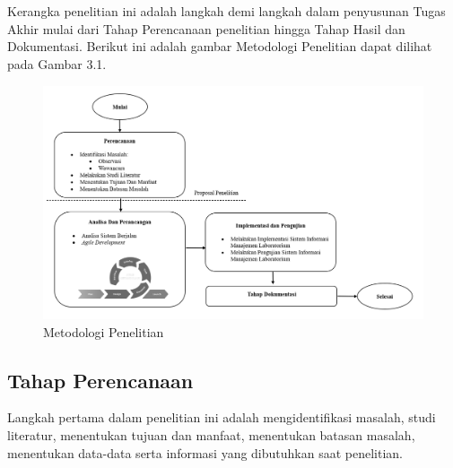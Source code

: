 %
%
%
%


\chapter{\babTiga}
Kerangka penelitian ini adalah langkah demi langkah dalam penyusunan Tugas Akhir mulai dari Tahap Perencanaan penelitian hingga Tahap Hasil dan Dokumentasi. Berikut ini adalah gambar Metodologi Penelitian dapat dilihat pada Gambar 3.1.
\begin{figure}
	\centering
	\includegraphics[width=0.82\linewidth]{konten//gambar/metodologi-penelitian.png}
	\caption{Metodologi Penelitian}
	\label{fig:enter-label}
\end{figure}

\section{Tahap Perencanaan}
Langkah pertama dalam penelitian ini adalah mengidentifikasi masalah, studi literatur, menentukan tujuan dan manfaat, menentukan batasan masalah, menentukan data-data serta informasi yang dibutuhkan saat penelitian.


